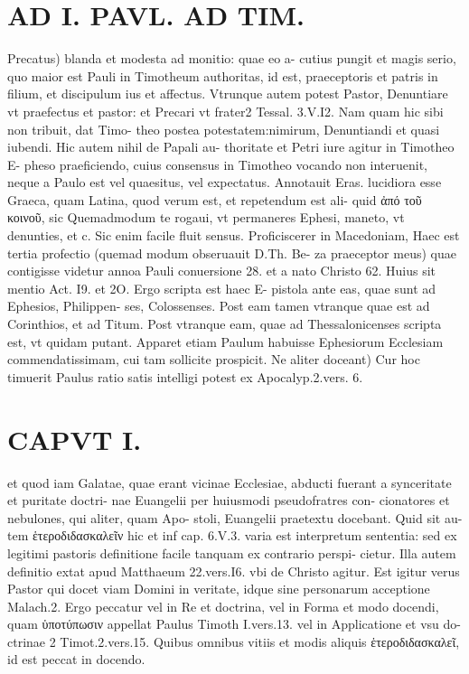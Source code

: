 \documentclass{article}
\begin{document}
\begin{pages}
\section*{AD I. PAVL. AD TIM. }
\marginpar{[ p.8 ]}\pstart Precatus) blanda et modesta ad monitio: quae eo a- cutius pungit et magis serio, quo maior est Pauli in Timotheum authoritas, id est, praeceptoris et patris in filium, et discipulum ius et affectus. Vtrunque autem potest Pastor, Denuntiare vt praefectus et pastor: et Precari vt frater2 Tessal. 3.V.I2. Nam quam hic sibi non tribuit, dat Timo- theo postea potestatem:nimirum, Denuntiandi et quasi iubendi. Hic autem nihil de Papali au- thoritate et Petri iure agitur in Timotheo E- pheso praeficiendo, cuius consensus in Timotheo vocando non interuenit, neque a Paulo est vel quaesitus, vel expectatus.  \pend\pstart Annotauit Eras. lucidiora esse Graeca, quam Latina, quod verum est, et repetendum est ali- quid ἀπό τοῦ κοινοῦ, sic Quemadmodum te rogaui, vt permaneres Ephesi, maneto, vt denunties, et c. Sic enim facile fluit sensus.  \pend\pstart Proficiscerer in Macedoniam, Haec est tertia profectio (quemad modum obseruauit D.Th. Be- za praeceptor meus) quae contigisse videtur annoa Pauli conuersione 28. et a nato Christo 62. Huius sit mentio Act. I9. et 2O. Ergo scripta est haec E- pistola ante eas, quae sunt ad Ephesios, Philippen- ses, Colossenses. Post eam tamen vtranque quae est ad Corinthios, et ad Titum. Post vtranque eam, quae ad Thessalonicenses scripta est, vt quidam putant.  \pend\pstart Apparet etiam Paulum habuisse Ephesiorum Ecclesiam commendatissimam, cui tam sollicite prospicit.  \pend\pstart Ne aliter doceant) Cur hoc timuerit Paulus ratio satis intelligi potest ex Apocalyp.2.vers. 6.  \pend
\section*{CAPVT I. }
\marginpar{[ p.9 ]}\pstart et quod iam Galatae, quae erant vicinae Ecclesiae, abducti fuerant a synceritate et puritate doctri- nae Euangelii per huiusmodi pseudofratres con- cionatores et nebulones, qui aliter, quam Apo- stoli, Euangelii praetextu docebant. Quid sit au- tem ἑτεροδιδασκαλεῖν hic et inf cap. 6.V.3. varia est interpretum sententia: sed ex legitimi pastoris definitione facile tanquam ex contrario perspi- cietur. Illa autem definitio extat apud Matthaeum 22.vers.I6. vbi de Christo agitur. Est igitur verus Pastor qui docet viam Domini in veritate, idque  sine personarum acceptione Malach.2. Ergo peccatur vel in Re et doctrina, vel in Forma et modo docendi, quam ὑποτύπωσιν appellat Paulus  Timoth I.vers.13. vel in Applicatione et vsu do- ctrinae 2 Timot.2.vers.15. Quibus omnibus vitiis et modis aliquis ἑτεροδιδασκαλεῖ, id est peccat in docendo.  \pend
{}
{}

\end{pages}
\end{document}
